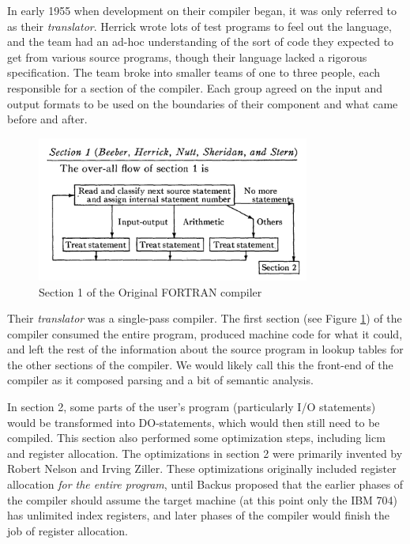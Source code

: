 In early 1955 when development on their compiler began, it was only referred to as their \textit{translator}.
Herrick wrote lots of test programs to feel out the language, and the team had an ad-hoc understanding of the
sort of code they expected to get from various source programs, though their language lacked a
rigorous specification.
The team broke into smaller teams of one to three people, each responsible for a section of the compiler.
Each group agreed on the input and output formats to be used on the boundaries of their component and what came before and after.

\begin{figure}[h]
	\centering
	\includegraphics[width=0.8\textwidth]{resource/dawn/backus-fortran-sec-1.png}
	\caption{Section 1 of the Original FORTRAN compiler\cite{backus_etal_fortran_automatic_coding_system_1957}}
	\label{fig:backus_fortran_compiler}
\end{figure}

Their \textit{translator} was a single-pass compiler.
The first section (see Figure \ref{fig:backus_fortran_compiler}) of the compiler
consumed the entire program, produced machine code for what it could,
and left the rest of the information about the source program in lookup tables
for the other sections of the compiler.
We would likely call this the front-end of the compiler as it composed
parsing and a bit of semantic analysis.

In section 2, some parts of the user's program (particularly I/O statements)
would be transformed into DO-statements, which would then still need to be compiled.
This section also performed some optimization steps, including \gls{licm} and
register allocation.
The optimizations in section 2 were primarily invented by Robert Nelson and Irving Ziller.
These optimizations originally included register allocation \textit{for the entire program},
until Backus proposed that the earlier phases of the compiler should assume the
target machine (at this point only the IBM 704) has unlimited index registers,
and later phases of the compiler would finish the job of register allocation.

